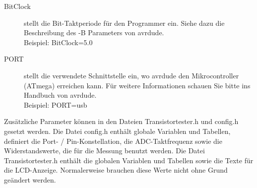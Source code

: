 \begin{description}
  \item[BitClock] stellt die Bit-Taktperiode für den Programmer ein. Siehe dazu die Beschreibung des -B Parameters von avrdude.\\
Beispiel: BitClock=5.0

  \item[PORT] stellt die verwendete Schnittstelle ein, wo avrdude den Mikrocontroller (ATmega) erreichen kann.
Für weitere Informationen schauen Sie bitte ins Handbuch von avrdude.\\
Beispiel: PORT=usb

\end{description}

Zusätzliche Parameter können in den Dateien Transistortester.h und config.h gesetzt werden.
Die Datei config.h enthält globale Variablen und Tabellen, definiert die Port- / Pin-Konstellation,
die ADC-Taktfrequenz sowie die Widerstandswerte, die für die Messung benutzt werden.
Die Datei Transistortester.h enthält die globalen Variablen und Tabellen sowie die Texte für die LCD-Anzeige.
Normalerweise brauchen diese Werte nicht ohne Grund geändert werden.
